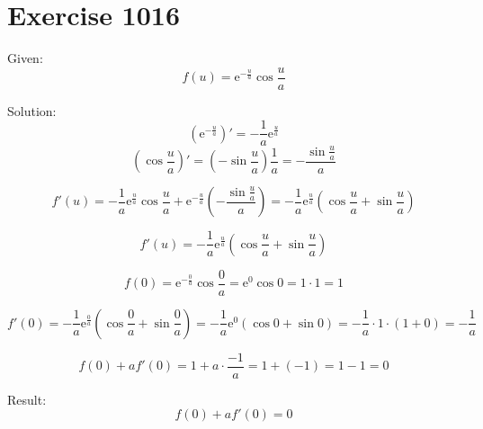\documentclass[a4paper, 10pt]{scrartcl}
\newcommand*\euler{\mathrm{e}}
\begin{document}
\section{Exercise 1016}

Given:
\[
f(u) = \euler^{-\frac{u}{a}}\cos{\frac{u}{a}}
\]

Solution:
\[
\left(\euler^{-\frac{u}{a}}\right)' = -\frac{1}{a}\euler^{\frac{u}{a}}
\]
\[
(\cos{\frac{u}{a}})' = (-\sin{\frac{u}{a}})\frac{1}{a} = -\frac{\sin{\frac{u}{a}}}{a}
\]

\[
f'(u) = -\frac{1}{a}\euler^{\frac{u}{a}}\cos{\frac{u}{a}} + \euler^{-\frac{u}{a}}(-\frac{\sin{\frac{u}{a}}}{a}) =
-\frac{1}{a}\euler^{\frac{u}{a}}(\cos{\frac{u}{a}} + \sin{\frac{u}{a}})
\]

\[
f'(u) = -\frac{1}{a}\euler^{\frac{u}{a}}(\cos{\frac{u}{a}} + \sin{\frac{u}{a}})
\]

\[
f(0) = \euler^{-\frac{0}{a}}\cos{\frac{0}{a}} = \euler^{0}\cos{0} = 1\cdot 1 = 1
\]

\[
f'(0) = -\frac{1}{a}\euler^{\frac{0}{a}}(\cos{\frac{0}{a}} + \sin{\frac{0}{a}}) = -\frac{1}{a}\euler^{0}(\cos{0} + \sin{0}) =
-\frac{1}{a}\cdot 1 \cdot(1 + 0) = -\frac{1}{a}
\]

\[
f(0) + af'(0) = 1 + a\cdot\frac{-1}{a} = 1 + (-1) = 1 - 1 = 0
\]

Result:
\[
f(0) + af'(0) = 0
\]
\end{document}

